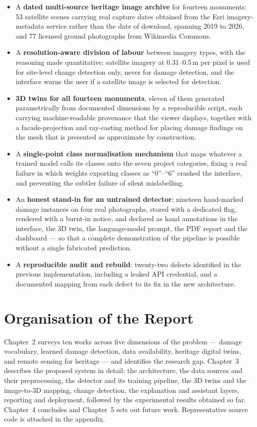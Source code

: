 \documentclass[a4paper,12pt,oneside]{book}
\begin{document}
\begin{itemize}
    \item A \textbf{dated multi-source heritage image archive} for fourteen monuments: 53 satellite scenes carrying real capture dates obtained from the Esri imagery-metadata service rather than the date of download, spanning 2019 to 2026, and 77 licensed ground photographs from Wikimedia Commons.
    \item A \textbf{resolution-aware division of labour} between imagery types, with the reasoning made quantitative: satellite imagery at 0.31--0.5\,m per pixel is used for site-level change detection only, never for damage detection, and the interface warns the user if a satellite image is selected for detection.
    \item \textbf{3D twins for all fourteen monuments}, eleven of them generated parametrically from documented dimensions by a reproducible script, each carrying machine-readable provenance that the viewer displays, together with a facade-projection and ray-casting method for placing damage findings on the mesh that is presented as approximate by construction.
    \item A \textbf{single-point class normalisation mechanism} that maps whatever a trained model calls its classes onto the seven project categories, fixing a real failure in which weights exporting classes as ``0''--``6'' crashed the interface, and preventing the subtler failure of silent mislabelling.
    \item An \textbf{honest stand-in for an untrained detector}: nineteen hand-marked damage instances on four real photographs, stored with a dedicated flag, rendered with a burnt-in notice, and declared as hand annotations in the interface, the 3D twin, the language-model prompt, the PDF report and the dashboard --- so that a complete demonstration of the pipeline is possible without a single fabricated prediction.
    \item A \textbf{reproducible audit and rebuild}: twenty-two defects identified in the previous implementation, including a leaked API credential, and a documented mapping from each defect to its fix in the new architecture.
\end{itemize}

\section{Organisation of the Report}
Chapter~2 surveys ten works across five dimensions of the problem --- damage vocabulary, learned damage detection, data availability, heritage digital twins, and remote sensing for heritage --- and identifies the research gap. Chapter~3 describes the proposed system in detail: the architecture, the data sources and their preprocessing, the detector and its training pipeline, the 3D twins and the image-to-3D mapping, change detection, the explanation and assistant layers, reporting and deployment, followed by the experimental results obtained so far. Chapter~4 concludes and Chapter~5 sets out future work. Representative source code is attached in the appendix.
\end{document}
